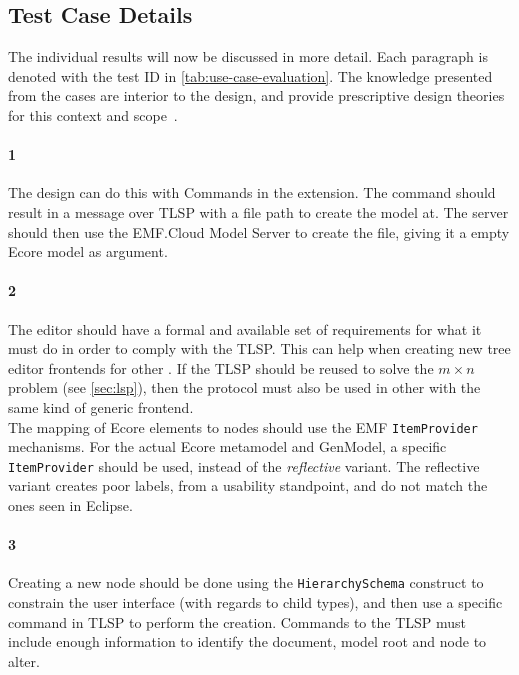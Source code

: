 

\subsection{Test Case Details}
The individual results will now be discussed in more detail.
Each paragraph is denoted with the test ID in \cref{tab:use-case-evaluation}.
The knowledge presented from the cases are interior to the design, and provide prescriptive design theories for this context and scope~\cite{sonnenbergEvaluationsScienceArtificial2012}.

\paragraph{1} The design can do this with Commands in the extension.
The command should result in a message over \acrshort{TLSP} with a file path to create the model at.
The server should then use the EMF.Cloud Model Server to create the file, giving it a empty \gls{Ecore} model as argument.

\paragraph{2} The editor should have a formal and available set of requirements for what it must do in order to comply with the \acrshort{TLSP}.
This can help when creating new tree editor frontends for other .
If the \acrshort{TLSP} should be reused to solve the \(m \times n\) problem (see \cref{sec:lsp}), then the protocol must also be used in other  with the same kind of generic frontend.\\

The mapping of \gls{Ecore} elements to nodes should use the \acrshort{EMF} \texttt{ItemProvider} mechanisms.
For the actual \gls{Ecore} metamodel and GenModel, a specific \texttt{ItemProvider} should be used, instead of the \textit{reflective} variant.
The reflective variant creates poor labels, from a usability standpoint, and do not match the ones seen in \gls{Eclipse}.


\paragraph{3} Creating a new node should be done using the \texttt{HierarchySchema} construct to constrain the user interface (with regards to child types), and then use a specific command in \acrshort{TLSP} to perform the creation.
Commands to the \acrshort{TLSP} must include enough information to identify the document, model root and node to alter.\\


